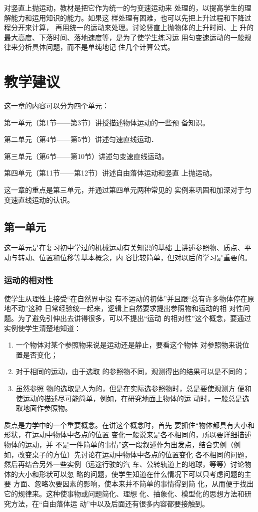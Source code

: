 对竖直上抛运动，教材是把它作为统一的匀变速运动来
处理的，以提高学生的理解能力和运用知识的能力。如果这
样处理有困难，也可以先把上升过程和下降过程分开来计算，
再用统一的运动来处理。讨论竖直上抛物体的上升时间、上
升的最大高度、下落时间、落地速度等，是为了使学生练习运
用匀变速运动的一般规律来分析具体问题，而不是单纯地记
住几个计算公式。

\section{教学建议}
这一章的内容可以分为四个单元：

第一单元（第1节——第3节）讲授描述物体运动的一些预
备知识。

第二单元（第4节——第5节）讲述匀速直线运动．

第三单元（第6节——第10节）讲述匀变速直线运动。

第四单元（第11节——第12节）讲述自由落体运动和竖直
上抛运动。

这一章的重点是第三单元，并通过第四单元两种常见的
实例来巩固和加深对于匀变速直线运动的认识。

\subsection{第一单元}
这一单元是在复习初中学过的机械运动有关知识的基础
上讲述参照物、质点、平动与转动、位置和位移等基本概念，内
容比较简单，但对以后的学习是重要的。

\subsubsection{运动的相对性}

使学生从理性上接受“在自然界中没
有不运动的初体”并且跟“总有许多物体停在原地不动”这种
日常经验统一起来，逻辑上自然要求提出参照物和运动的相
对性问题。为了避免引伸出去讲得很多，可以不提出“运动
的相对性”这个概念，要通过实例使学生清楚地知道：
\begin{enumerate}
    \item 一个物体对某个参照物来说是运动还是静止，要看这个物体
    对参照物来说位置是否变化；
    \item 对于相同的运动，由于选取
    的参照物不同，观测得出的结果可以是不同的；
    \item 虽然参照
    物的选取是人为的，但是在实际选参照物时，总是要使观测方
    便和使运动的描述尽可能简单，例如，在研究地面上物体的运
    动时，一般总是选取地面作参照物。
\end{enumerate}

质点是力学中的一个重要概念。在讲这个概念时，首先
要抓住“物体都具有大小和形状，在运动中物体中各点的位置
变化一般说来是各不相同的，所以要详细描述物体的运动，并
不是一件简单的事情”这一段叙述作为出发点，结合实例（例
如，改变桌子的方位）先讨论在运动中物体中各点的位置变化
各不相同的问题，然后再结合另外一些实例（远途行驶的汽
车、公转轨道上的地球，等等）讨论物体的大小和形状可以忽
略的问题，使学生知道在什么情况下可以只考虑问题的主要
方面、忽略次要因素的影响，使本来并不简单的事情得到简
化，从而便于找出它的规律来。这种使事物或问题简化、理想
化、抽象化、模型化的思想方法和研究方法，在“自由落体运
动”中以及后面还有很多内容都要接触到。

